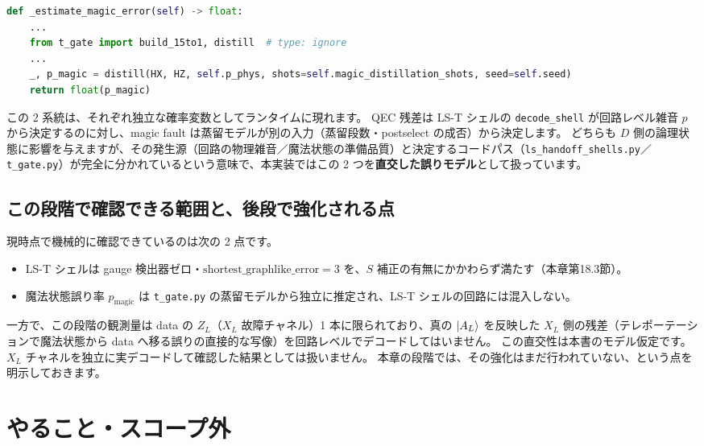 \begin{lstlisting}[language=Python, caption={魔法状態誤り率は t\_gate.py の蒸留モデルから推定される（\codepath{src/stages/02_circuit_level/src/ftqc/hybrid_ftqc_runtime.py}）}]
def _estimate_magic_error(self) -> float:
    ...
    from t_gate import build_15to1, distill  # type: ignore
    ...
    _, p_magic = distill(HX, HZ, self.p_phys, shots=self.magic_distillation_shots, seed=self.seed)
    return float(p_magic)
\end{lstlisting}

この 2 系統は、それぞれ独立な確率変数としてランタイムに現れます。
QEC 残差は LS-T シェルの \texttt{decode\_shell} が回路レベル雑音 $p$ から決定するのに対し、magic fault は蒸留モデルが別の入力（蒸留段数・postselect の成否）から決定します。
どちらも $D$ 側の論理状態に影響を与えますが、その発生源（回路の物理雑音／魔法状態の準備品質）と決定するコードパス（\texttt{ls\_handoff\_shells.py}／\texttt{t\_gate.py}）が完全に分かれているという意味で、本実装ではこの 2 つを\textbf{直交した誤りモデル}として扱っています。

\subsection{この段階で確認できる範囲と、後段で強化される点}

現時点で機械的に確認できているのは次の 2 点です。

\begin{itemize}
  \item LS-T シェルは gauge 検出器ゼロ・$\mathrm{shortest\_graphlike\_error}=3$ を、$S$ 補正の有無にかかわらず満たす（本章第18.3節）。
  \item 魔法状態誤り率 $p_{\text{magic}}$ は \texttt{t\_gate.py} の蒸留モデルから独立に推定され、LS-T シェルの回路には混入しない。
\end{itemize}

一方で、この段階の観測量は data の $Z_L$（$X_L$ 故障チャネル）1 本に限られており、真の $\ket{A_L}$ を反映した $X_L$ 側の残差（テレポーテーションで魔法状態から data へ移る誤りの直接的な写像）を回路レベルでデコードしてはいません。
この直交性は本書のモデル仮定です。$X_L$ チャネルを独立に実デコードして確認した結果としては扱いません。
本章の段階では、その強化はまだ行われていない、という点を明示しておきます。

\section{やること・スコープ外}\label{sec:ls_t_scope}

